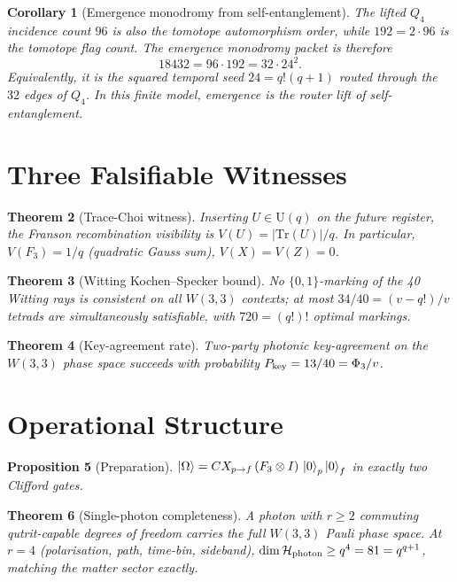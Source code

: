 \documentclass[11pt]{article}
\newtheorem{theorem}{Theorem}
\newtheorem{proposition}[theorem]{Proposition}
\newtheorem{corollary}[theorem]{Corollary}
\begin{document}
\begin{corollary}[Emergence monodromy from self-entanglement]\label{cor:q4_monodromy}
The lifted $Q_4$ incidence count $96$ is also the tomotope automorphism
order, while $192=2\cdot96$ is the tomotope flag count.  The emergence
monodromy packet is therefore
\[
  18432 = 96\cdot192 = 32\cdot24^2.
\]
Equivalently, it is the squared temporal seed $24=q!(q+1)$ routed
through the $32$ edges of $Q_4$.  In this finite model, emergence is the
router lift of self-entanglement.
\end{corollary}

\section{Three Falsifiable Witnesses}

\begin{theorem}[Trace-Choi witness]\label{thm:trace}
Inserting $U\in\mathrm{U}(q)$ on the future register, the Franson
recombination visibility is $V(U) = |\mathrm{Tr}(U)|/q$.  In particular,
$V(F_3) = 1/q$ (quadratic Gauss sum), $V(X) = V(Z) = 0$.
\end{theorem}

\begin{theorem}[Witting Kochen--Specker bound]\label{thm:KS}
No $\{0,1\}$-marking of the 40 Witting rays is consistent on all $W(3,3)$
contexts; at most $34/40 = (v - q!)/v$ tetrads are simultaneously
satisfiable, with $720 = (q!)!$ optimal markings.
\end{theorem}

\begin{theorem}[Key-agreement rate]\label{thm:key}
Two-party photonic key-agreement on the $W(3,3)$ phase space succeeds
with probability $P_{\rm key} = 13/40 = \Phi_3/v$.
\end{theorem}

\section{Operational Structure}

\begin{proposition}[Preparation]\label{prop:prep}
$\ket{\Omega} = CX_{p\to f}\,(F_3 \otimes I)\,\ket{0}_p\ket{0}_f$ in
exactly two Clifford gates.
\end{proposition}

\begin{theorem}[Single-photon completeness]\label{thm:completeness}
A photon with $r \ge 2$ commuting qutrit-capable degrees of freedom
carries the full $W(3,3)$ Pauli phase space.  At $r = 4$ (polarisation,
path, time-bin, sideband), $\dim\mathcal H_{\rm photon} \ge q^4 = 81 =
q^{q+1}$, matching the matter sector exactly.
\end{theorem}
\end{document}
